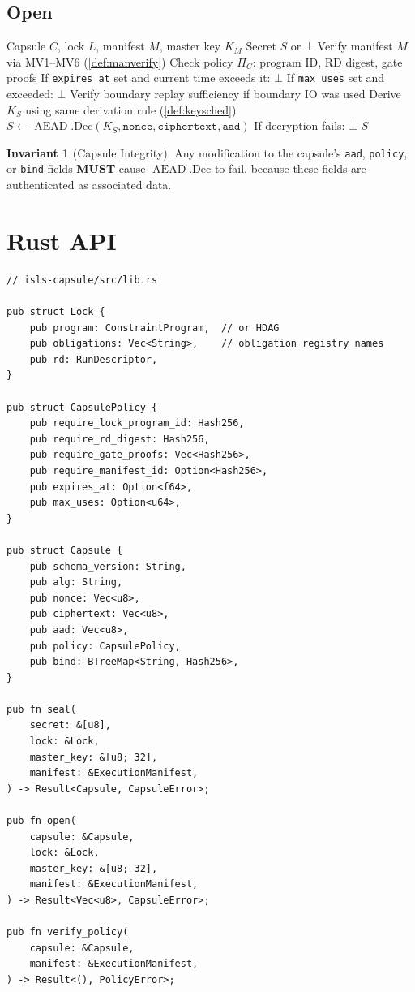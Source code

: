 \documentclass[11pt,a4paper,twoside]{article}
\theoremstyle{definition}
\newtheorem{invariant}{Invariant}[section]
\theoremstyle{plain}
\theoremstyle{remark}
\DeclareMathOperator{\AEAD}{AEAD}
\begin{document}
\subsection{Open}

\begin{algorithm}[H]
\caption{\textsc{Open}: Decrypt secret under verified evidence}
\label{alg:open}
\begin{algorithmic}[1]
\REQUIRE Capsule $C$, lock $L$, manifest $M$, master key $K_M$
\ENSURE Secret $S$ or $\bot$
\STATE Verify manifest $M$ via MV1--MV6 (\cref{def:manverify})
\STATE Check policy $\Pi_C$: program ID, RD digest, gate proofs
\STATE If \texttt{expires\_at} set and current time exceeds it:
  \RETURN $\bot$
\STATE If \texttt{max\_uses} set and exceeded: \RETURN $\bot$
\STATE Verify boundary replay sufficiency if boundary IO was used
\STATE Derive $K_S$ using same derivation rule (\cref{def:keysched})
\STATE $S \gets \AEAD.\mathrm{Dec}(K_S, \mathtt{nonce}, \mathtt{ciphertext}, \mathtt{aad})$
\STATE If decryption fails: \RETURN $\bot$
\RETURN $S$
\end{algorithmic}
\end{algorithm}

\begin{invariant}[Capsule Integrity]\label{inv:capsule}
Any modification to the capsule's \texttt{aad}, \texttt{policy}, or
\texttt{bind} fields \textbf{MUST} cause $\AEAD.\mathrm{Dec}$ to fail,
because these fields are authenticated as associated data.
\end{invariant}

\section{Rust API}\label{sec:cap:api}

\begin{verbatim}
// isls-capsule/src/lib.rs

pub struct Lock {
    pub program: ConstraintProgram,  // or HDAG
    pub obligations: Vec<String>,    // obligation registry names
    pub rd: RunDescriptor,
}

pub struct CapsulePolicy {
    pub require_lock_program_id: Hash256,
    pub require_rd_digest: Hash256,
    pub require_gate_proofs: Vec<Hash256>,
    pub require_manifest_id: Option<Hash256>,
    pub expires_at: Option<f64>,
    pub max_uses: Option<u64>,
}

pub struct Capsule {
    pub schema_version: String,
    pub alg: String,
    pub nonce: Vec<u8>,
    pub ciphertext: Vec<u8>,
    pub aad: Vec<u8>,
    pub policy: CapsulePolicy,
    pub bind: BTreeMap<String, Hash256>,
}

pub fn seal(
    secret: &[u8],
    lock: &Lock,
    master_key: &[u8; 32],
    manifest: &ExecutionManifest,
) -> Result<Capsule, CapsuleError>;

pub fn open(
    capsule: &Capsule,
    lock: &Lock,
    master_key: &[u8; 32],
    manifest: &ExecutionManifest,
) -> Result<Vec<u8>, CapsuleError>;

pub fn verify_policy(
    capsule: &Capsule,
    manifest: &ExecutionManifest,
) -> Result<(), PolicyError>;
\end{verbatim}
\end{document}
